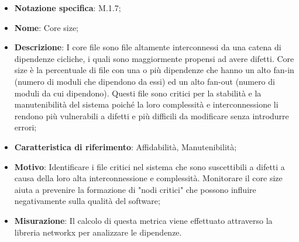 \begin{itemize}
    \item \textbf{Notazione specifica}: M.1.7;
    \item \textbf{Nome}: Core size;
    \item \textbf{Descrizione}: I core file sono file altamente interconnessi da una catena di dipendenze cicliche, i quali sono maggiormente propensi ad avere difetti. Core size è la percentuale di file con una o più dipendenze che hanno un alto fan-in (numero di moduli che dipendono da essi) ed un alto fan-out (numero di moduli da cui dipendono). Questi file sono critici per la stabilità e la manutenibilità del sistema poiché la loro complessità e interconnessione li rendono più vulnerabili a difetti e più difficili da modificare senza introdurre errori;
    \item \textbf{Caratteristica di riferimento}: Affidabilità, Manutenibilità;
    \item \textbf{Motivo}: Identificare i file critici nel sistema che sono suscettibili a difetti a causa della loro alta interconnessione e complessità. Monitorare il core size aiuta a prevenire la formazione di "nodi critici" che possono influire negativamente sulla qualità del software;
    \item \textbf{Misurazione}: Il calcolo di questa metrica viene effettuato attraverso la libreria networkx per analizzare le dipendenze.
\end{itemize}
